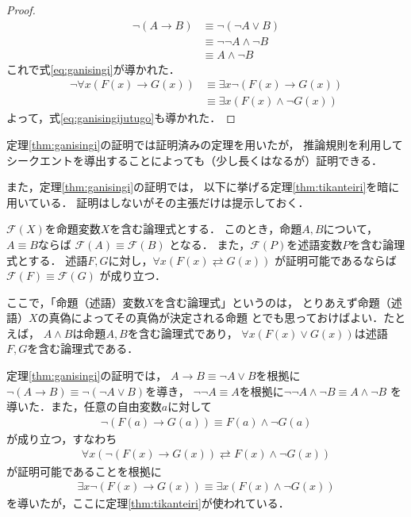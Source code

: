    \begin{proof}
     \begin{align*}
       \lnot ( A \to B ) & \equiv \lnot ( \lnot A \lor B) \\
       & \equiv \lnot \lnot A \land \lnot B \\
       & \equiv A \land \lnot B 
     \end{align*}
     これで式\eqref{eq:ganisingi}が導かれた．
     \begin{align*}
       \lnot \forall x ( F(x) \to G(x) ) 
       & \equiv \exists x \lnot ( F(x) \to G(x) ) \\
       & \equiv \exists x ( F(x) \land \lnot G(x) )
     \end{align*}
     よって，式\eqref{eq:ganisingijutugo}も導かれた．
   \end{proof}
   定理\ref{thm:ganisingi}の証明では証明済みの定理を用いたが，
   推論規則を利用して
   シークエントを導出することによっても（少し長くはなるが）証明できる．

   また，定理\ref{thm:ganisingi}の証明では，
   以下に挙げる定理\ref{thm:tikanteiri}を暗に用いている．
   証明はしないがその主張だけは提示しておく．
   \begin{thm}[置換定理] \label{thm:tikanteiri}
     $\mathscr{F}(X)$を命題変数$X$を含む論理式とする．
     このとき，命題$A,B$について，$A \equiv B$ならば
     $\mathscr{F}(A) \equiv \mathscr{F}(B)$
     となる．
     また，$\mathscr{F}(P)$を述語変数$P$を含む論理式とする．
     述語$F,G$に対し，$\forall x (F(x) \rightleftarrows G(x))$
     が証明可能であるならば$\mathscr{F}(F) \equiv \mathscr{F}(G)$
     が成り立つ．
   \end{thm}
   ここで，「命題（述語）変数$X$を含む論理式」というのは，
   とりあえず命題（述語）$X$の真偽によってその真偽が決定される命題
   とでも思っておけばよい．たとえば，
   $A \land B$は命題$A,B$を含む論理式であり，
   $\forall x (F(x) \lor G(x))$は述語$F,G$を含む論理式である．

   定理\ref{thm:ganisingi}の証明では，
   $A \to B \equiv \lnot A \lor B$を根拠に
   $\lnot ( A \to B ) \equiv \lnot ( \lnot A \lor B)$を導き，
   $\lnot \lnot A \equiv A$を根拠に$\lnot \lnot A \land \lnot B \equiv A \land \lnot B$
   を導いた．また，任意の自由変数$a$に対して
   \begin{align*}
     \lnot ( F(a) \to G(a) ) \equiv F(a) \land \lnot G(a) 
   \end{align*}
   が成り立つ，すなわち
   \begin{align*}
     \forall x ( \lnot ( F(x) \to G(x) ) \rightleftarrows F(x) \land \lnot G(x) )
   \end{align*}
   が証明可能であることを根拠に
   \begin{align*}
     \exists x \lnot ( F(x) \to G(x) ) \equiv \exists x ( F(x) \land \lnot G(x) )
   \end{align*}
   を導いたが，ここに定理\ref{thm:tikanteiri}が使われている．

